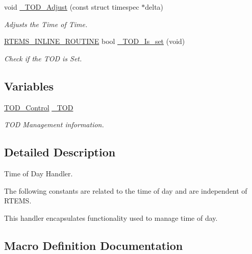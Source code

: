 \begin{DoxyCompactItemize}
void \mbox{\hyperlink{group__RTEMSScoreTOD_ga672f574f652f79e2c365869a8c7b7895}{\+\_\+\+T\+O\+D\+\_\+\+Adjust}} (const struct timespec $\ast$delta)
\begin{DoxyCompactList}\small\item\em Adjusts the Time of Time. \end{DoxyCompactList}\item 
\mbox{\hyperlink{group__RTEMSScoreBaseDefs_gac216239df231d5dbd15e3520b0b9313f}{R\+T\+E\+M\+S\+\_\+\+I\+N\+L\+I\+N\+E\+\_\+\+R\+O\+U\+T\+I\+NE}} bool \mbox{\hyperlink{group__RTEMSScoreTOD_gad7357f287de1aec092ef824c185229b9}{\+\_\+\+T\+O\+D\+\_\+\+Is\+\_\+set}} (void)
\begin{DoxyCompactList}\small\item\em Check if the T\+OD is Set. \end{DoxyCompactList}\end{DoxyCompactItemize}
\subsection*{Variables}
\begin{DoxyCompactItemize}
\item 
\mbox{\label{group__RTEMSScoreTOD_ga437c5ed735e03c0449d68cd8f54c44ad}} 
\mbox{\hyperlink{structTOD__Control}{T\+O\+D\+\_\+\+Control}} \mbox{\hyperlink{group__RTEMSScoreTOD_ga437c5ed735e03c0449d68cd8f54c44ad}{\+\_\+\+T\+OD}}
\begin{DoxyCompactList}\small\item\em T\+OD Management information. \end{DoxyCompactList}\end{DoxyCompactItemize}


\subsection{Detailed Description}
Time of Day Handler. 

The following constants are related to the time of day and are independent of R\+T\+E\+MS.

This handler encapsulates functionality used to manage time of day. 

\subsection{Macro Definition Documentation}
\mbox{\label{group__RTEMSScoreTOD_ga27b62f5494a5cb908c2c3ef6f14bc459}} 
